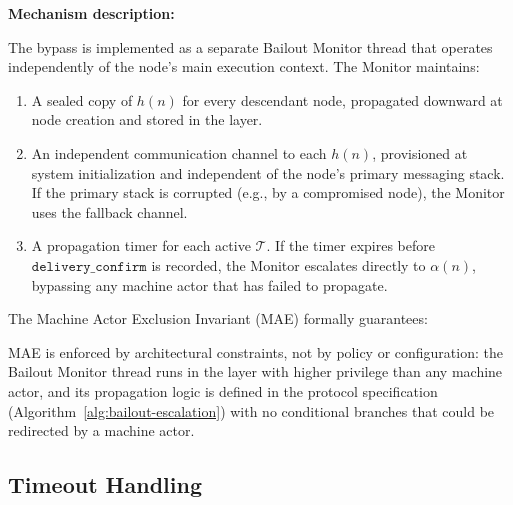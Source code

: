 \bigskip
\noindent\textbf{Mechanism description:}

The bypass is implemented as a separate Bailout Monitor thread that operates
independently of the node's main execution context. The Monitor maintains:

\begin{enumerate}
\itemsep=0pt
\item A sealed copy of $h(n)$ for every descendant node, propagated downward
  at node creation and stored in the \fact{} layer.
\item An independent communication channel to each $h(n)$, provisioned at
  system initialization and independent of the node's primary messaging stack.
  If the primary stack is corrupted (e.g., by a compromised node), the Monitor
  uses the fallback channel.
\item A propagation timer for each active $\mathcal{T}$. If the timer expires
  before $\texttt{delivery\_confirm}$ is recorded, the Monitor escalates directly
  to $\alpha(n)$, bypassing any machine actor that has failed to propagate.
\end{enumerate}

The Machine Actor Exclusion Invariant (MAE) formally guarantees:

\begin{center}
\end{center}

MAE is enforced by architectural constraints, not by policy or configuration:
the Bailout Monitor thread runs in the \fact{} layer with higher privilege than
any machine actor, and its propagation logic is defined in the protocol
specification (Algorithm~\ref{alg:bailout-escalation}) with no conditional
branches that could be redirected by a machine actor.


\subsection{Timeout Handling}\label{sec:bailout-timeouts}

